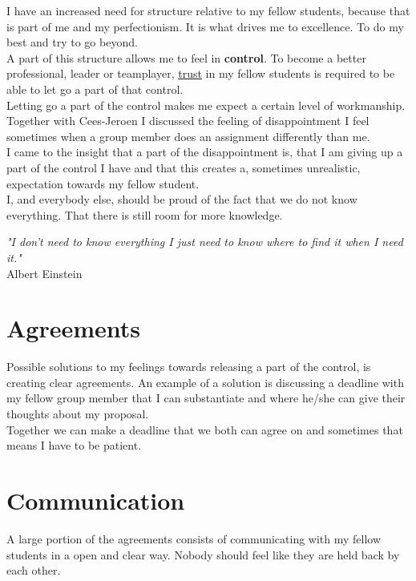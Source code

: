 \documentclass[11pt]{article}
\begin{document}
	I have an increased need for structure relative to my fellow students, because that is part of me and my perfectionism. It is what drives me to excellence. To do my best and try to go beyond. \\
	
	A part of this structure allows me to feel in \textbf{control}. To become a better professional, leader or teamplayer, \underline{trust} in my fellow students is required to be able to let go a part of that control.  \\
	
	Letting go a part of the control makes me expect a certain level of workmanship. Together with Cees-Jeroen I discussed the feeling of disappointment I feel sometimes when a group member does an assignment differently than me. \\
	
	I came to the insight that a part of the disappointment is, that I am giving up a part of the control I have and that this creates a, sometimes unrealistic, expectation towards my fellow student.\\
	
	I, and everybody else, should be proud of the fact that we do not know everything. That there is still room for more knowledge. 
\newpage
\begin{displayquote}
	\textit{"I don't need to know everything I just need to know where to find it when I need it."} \\ Albert Einstein
\end{displayquote}
	
	\section{Agreements}
	Possible solutions to my feelings towards releasing a part of the control, is creating clear agreements. An example of a solution is discussing a deadline with my fellow group member that I can substantiate and where he/she can give their thoughts about my proposal. \\
	
	Together we can make a deadline that we both can agree on and sometimes that means I have to be patient.
		
	\section{Communication}
	A large portion of the agreements consists of communicating with my fellow students in a open and clear way. Nobody should feel like they are held back by each other.\\
	
\end{document}
